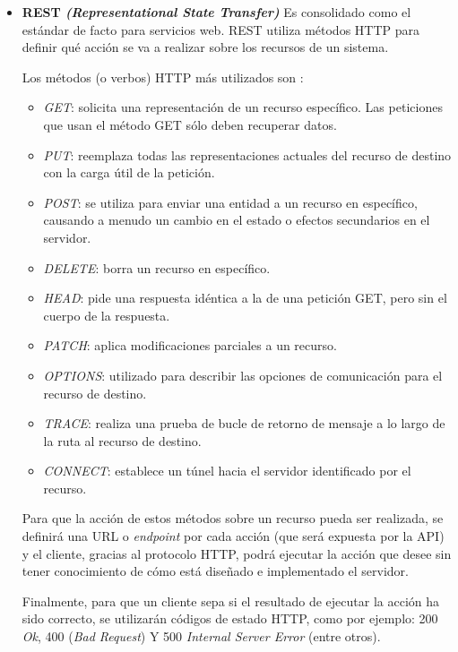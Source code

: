 \begin{itemize}
    \item \textbf{REST \textit{(Representational State Transfer)}}
    \newline
    Es consolidado como el estándar de facto para servicios web. REST utiliza métodos HTTP para definir qué acción 
    se va a realizar sobre los recursos de un sistema. 

    Los métodos (o verbos) HTTP más utilizados son \cite{metodosHttp}:

    \begin{itemize}
        \item \textit{GET}: solicita una representación de un recurso específico. Las peticiones que usan el método GET 
        sólo deben recuperar datos. 
        \item \textit{PUT}: reemplaza todas las representaciones actuales del recurso de destino con la carga útil de 
        la petición.
        \item \textit{POST}: se utiliza para enviar una entidad a un recurso en específico, causando a menudo un cambio 
        en el estado o efectos secundarios en el servidor.
        \item \textit{DELETE}: borra un recurso en específico.
        \item \textit{HEAD}: pide una respuesta idéntica a la de una petición GET, pero sin el cuerpo de la respuesta.
        \item \textit{PATCH}: aplica modificaciones parciales a un recurso.
        \item \textit{OPTIONS}: utilizado para describir las opciones de comunicación para el recurso de destino.
        \item \textit{TRACE}: realiza una prueba de bucle de retorno de mensaje a lo largo de la ruta al recurso de destino.
        \item \textit{CONNECT}: establece un túnel hacia el servidor identificado por el recurso.
    \end{itemize}

    Para que la acción de estos métodos sobre un recurso pueda ser realizada, se definirá una URL o \textit{endpoint} 
    por cada acción (que será expuesta por la API) y el cliente, gracias al protocolo HTTP, podrá ejecutar la acción 
    que desee sin tener conocimiento de cómo está diseñado e implementado el servidor.

    Finalmente, para que un cliente sepa si el resultado de ejecutar la acción ha sido correcto, se utilizarán códigos
    de estado HTTP, como por ejemplo: 200 \textit{Ok}, 400 (\textit{Bad Request}) Y 500 \textit{Internal Server Error} 
    (entre otros).


\end{itemize}

